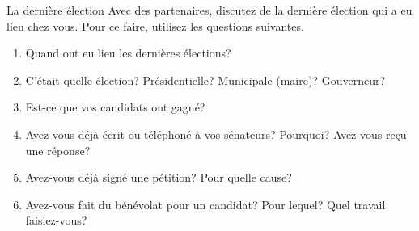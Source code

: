 \begin{frame}{La dernière élection}
  Avec des partenaires, discutez de \alert{la dernière élection} qui a eu lieu \alert{chez vous}.
  Pour ce faire, utilisez les questions suivantes.
  \begin{enumerate}
    \item Quand ont eu lieu les dernières élections?
    \item C'était quelle élection? Présidentielle? Municipale (maire)? Gouverneur?
    \item Est-ce que vos candidats ont gagné?
    \item Avez-vous déjà écrit ou téléphoné à vos sénateurs? Pourquoi? Avez-vous reçu une réponse?
    \item Avez-vous déjà signé une pétition? Pour quelle cause?
    \item Avez-vous fait du bénévolat pour un candidat? Pour lequel? Quel travail faisiez-vous?
  \end{enumerate}
\end{frame}